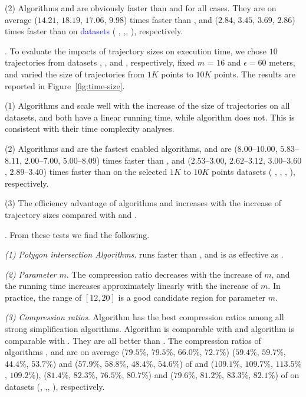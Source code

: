 \ni(2) Algorithms \cist and \cista are obviously faster than \dps and \squishe for all cases.
They are on average ($14.21$, $18.19$, $17.06$, $9.98$) times faster than \dps,
and ($2.84$, $3.45$, $3.69$, $2.86$) times faster than \squishe on
\textcolor{blue}{datasets} ( \sercar, {\geolife},\mopsi, \pricar), respectively.


.
To evaluate the impacts of trajectory sizes on execution time,
we chose {$10$} trajectories from {datasets}  \sercar, \geolife, \mopsi and \pricar, respectively,
fixed $m$ = $16$ and $\epsilon = 60$ meters, and varied the size  of trajectories from $1K$ points to $10K$ points.
%
The results are reported in Figure~\ref{fig:time-size}.

\ni(1) Algorithms \cist and \cista scale well with the increase of the size of trajectories on all datasets,
and both have a linear running time, while algorithm \dps does not.
This is consistent with their time complexity analyses.

\ni(2) Algorithms \cist and \cista are the fastest \sed enabled \lsa algorithms,
and are {($8.00$--$10.00$, $5.83$--$8.11$, $2.00$--$7.00$, $5.00$--$8.09$) times faster than \dps,
and {($2.53$--$3.00$, $2.62$--$3.12$, $3.00$--$3.60$, $2.89$--$3.40$)}} times faster
than \squishe  on the selected $1K$ to $10K$ points datasets ( \sercar,
\geolife, \mopsi, \pricar), respectively.

\ni(3) The efficiency advantage of algorithms \cist and \cista increases with the increase of trajectory sizes compared with \dps and \squishe.



.
From these tests we find the following.

\sstab \emph{(1) Polygon intersection Algorithms}. \rpia runs faster than \cpia, and is as effective as \cpia.

\sstab\emph{(2) Parameter $m$}. The compression ratio decreases with the increase of $m$, and the running time increases approximately linearly with the increase of $m$. In practice, the range of $[12, 20]$ is a good candidate region for parameter $m$.

\sstab\emph{(3) Compression ratios}. Algorithm \cisto has the best compression ratios among all strong simplification algorithms. Algorithm \cist is comparable with \dps and algorithm \cista is comparable with \cisto.
They are all better than \squishe.
The compression ratios of algorithms \cist, \cisto and \cista are on average
($79.5\%$, $79.5\%$, $66.0\%$, $72.7\%$)
{($59.4\%$, $59.7\%$, $44.4\%$, $53.7\%$)} and ($57.9\%$, $58.8\%$, $48.4\%$, $54.6\%$) of \squishe
and ($109.1\%$, $109.7\%$, $113.5\%$, $109.2\%$), {($81.4\%$, $82.3\%$, $76.5\%$, $80.7\%$)} and ($79.6\%$, $81.2\%$, $83.3\%$, $82.1\%$) of \dps on {datasets} (\sercar, \geolife,\mopsi, \pricar), respectively.


